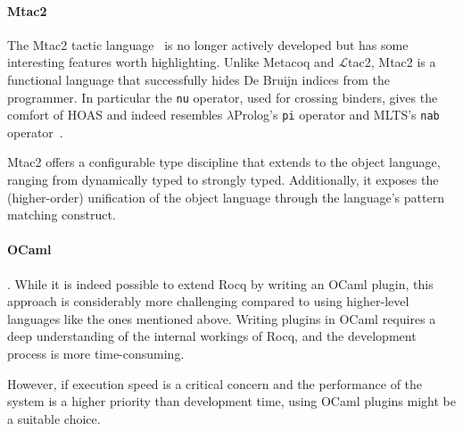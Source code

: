 \documentclass[sigplan,natbib=false]{acmart}
\begin{document}
\paragraph{Mtac2}

The Mtac2 tactic language~\cite{10.1145/3236773} is no longer actively
developed but has some interesting features worth highlighting. Unlike Metacoq
and $\mathcal{L}$tac2, Mtac2 is a functional language that successfully hides
De Bruijn indices from the programmer. In particular the \texttt{nu} operator, used for
crossing binders, gives the comfort of HOAS and indeed
resembles $\lambda$Prolog's \texttt{pi} operator and MLTS's \texttt{nab}
operator~\cite{10.1145/3354166.3354177}.

Mtac2 offers a configurable type discipline that extends to the object
language, ranging from dynamically typed to strongly typed.
Additionally, it exposes the (higher-order) unification of the object
language through the language's pattern matching construct.

\paragraph{OCaml}.
%
While it is indeed possible to extend Rocq by writing an
OCaml plugin, this approach is considerably more challenging compared to using
higher-level languages like the ones mentioned above. Writing plugins in OCaml requires a deep
understanding of the internal workings of Rocq, and the development process is
more time-consuming.

However, if execution speed is a critical concern and the performance of the
system is a higher priority than development time, using OCaml plugins might be
a suitable choice.

\newpage

\printbibliography
\end{document}
